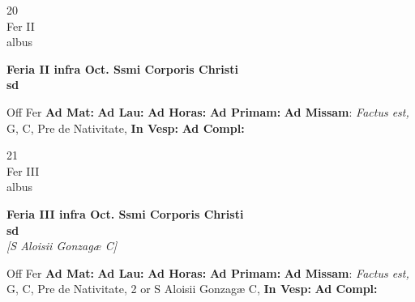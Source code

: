 \documentclass[10pt, openany]{book}
\begin{document}
    \begin{center}
        \begin{minipage}{3.5in}
            \vspace{2em}
            \begin{minipage}{0.5in}
                {\Huge 20} \\
                {\normalsize Fer II} \\
                {\normalsize albus}
            \end{minipage}
            \begin{minipage}{3.0in}
                \textbf{ \large Feria II infra Oct. Ssmi Corporis Christi \\
                \textnormal{\normalsize sd}} \\ 
            \end{minipage}
            \begin{justify}Off Fer
                \textbf{Ad Mat: }
                \textbf{Ad Lau: }
                \textbf{Ad Horas: }
                \textbf{Ad Primam: }\textbf{Ad Missam}: \textit{Factus est,} G, C, Pre de Nativitate,  
                \textbf{In Vesp: }
                \textbf{Ad Compl: }
            \end{justify}
        \end{minipage}
    \end{center}

    \begin{center}
        \begin{minipage}{3.5in}
            \vspace{2em}
            \begin{minipage}{0.5in}
                {\Huge 21} \\
                {\normalsize Fer III} \\
                {\normalsize albus}
            \end{minipage}
            \begin{minipage}{3.0in}
                \textbf{ \large Feria III infra Oct. Ssmi Corporis Christi \\
                \textnormal{\normalsize sd}} \\ \textit{[S Aloisii Gonzagæ C]} \\ 
            \end{minipage}
            \begin{justify}Off Fer
                \textbf{Ad Mat: }
                \textbf{Ad Lau: }
                \textbf{Ad Horas: }
                \textbf{Ad Primam: }\textbf{Ad Missam}: \textit{Factus est,} G, C, Pre de Nativitate, 2 or S Aloisii Gonzagæ C,  
                \textbf{In Vesp: }
                \textbf{Ad Compl: }
            \end{justify}
        \end{minipage}
    \end{center}
\end{document}

